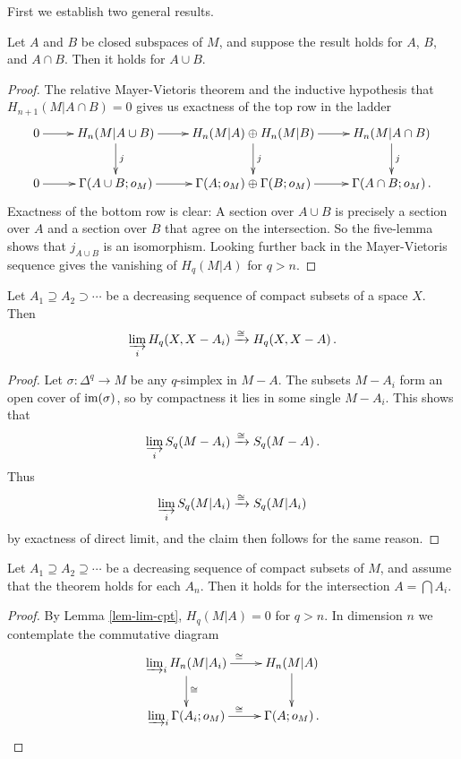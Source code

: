 First we establish two general results.
\begin{lemma} 
Let $A$ and $B$ be closed subspaces of $M$, and suppose the result
holds for $A$, $B$, and $A\cap B$. Then it holds for $A\cup B$.
\label{lem-mv}
\end{lemma}
\begin{proof}
The relative Mayer-Vietoris theorem and the inductive hypothesis that 
$H_{n+1}(M|A\cap B)=0$ gives us exactness of the top row in the ladder
\[
\xymatrix{
0 \ar[r] & H_n(M|A\cup B) \ar[d]^j \ar[r] & 
H_n(M|A)\oplus H_n(M|B) \ar[d]^j \ar[r] &
H_n(M|A\cap B) \ar[d]^j \\
0 \ar[r] & \Gamma(A\cup B;o_M) \ar[r] & 
\Gamma(A;o_M)\oplus\Gamma(B;o_M) \ar[r] &
\Gamma(A\cap B;o_M)\,.
}\]
Exactness of the bottom row is clear: A section over $A\cup B$ is precisely
a section over $A$ and a section over $B$ that agree on the intersection.
So the five-lemma shows that $j_{A\cup B}$ is an isomorphism. 
Looking further back in the Mayer-Vietoris sequence gives the vanishing of
$H_q(M|A)$ for $q>n$.  
\end{proof}
\begin{lemma}
\label{lem-lim-cpt}
Let $A_1\supseteq A_2\supset\cdots$ be a decreasing sequence of compact
subsets of a space $X$. Then 
\[
\varinjlim_iH_q(X,X-A_i)\xrightarrow{\cong}H_q(X,X-A)\,.
\]
\end{lemma}
\begin{proof}
Let $\sigma:\Delta^q\to M$ be any $q$-simplex in $M-A$. The subsets $M-A_i$
form an open cover of $\operatorname{im}(\sigma)$, so by compactness it lies in some
single $M-A_i$. This shows that 
\[
\varinjlim_iS_q(M-A_i)\xrightarrow{\cong}S_q(M-A)\,.
\]
Thus
\[
\varinjlim_iS_q(M|A_i)\xrightarrow{\cong}S_q(M|A_i)
\]
by exactness of direct limit, and the claim then follows for the same reason. 
\end{proof}
\begin{lemma} Let $A_1\supseteq A_2\supseteq\cdots$ be a decreasing sequence
of compact subsets of $M$, and assume that the theorem holds for each $A_n$.
Then it holds for the intersection $A=\bigcap A_i$. 
\label{lem-lim}
\end{lemma}
\begin{proof}
By Lemma \ref{lem-lim-cpt},
$H_q(M|A)=0$ for $q>n$. In dimension $n$ we contemplate
the commutative diagram 
\[
\xymatrix{
\varinjlim_iH_n(M|A_i) \ar[r]^\cong \ar[d]^\cong & H_n(M|A) \ar[d] \\
\varinjlim_i\Gamma(A_i;o_M) \ar[r]^\cong & \Gamma(A;o_M) \,.
}\]
\end{proof}
